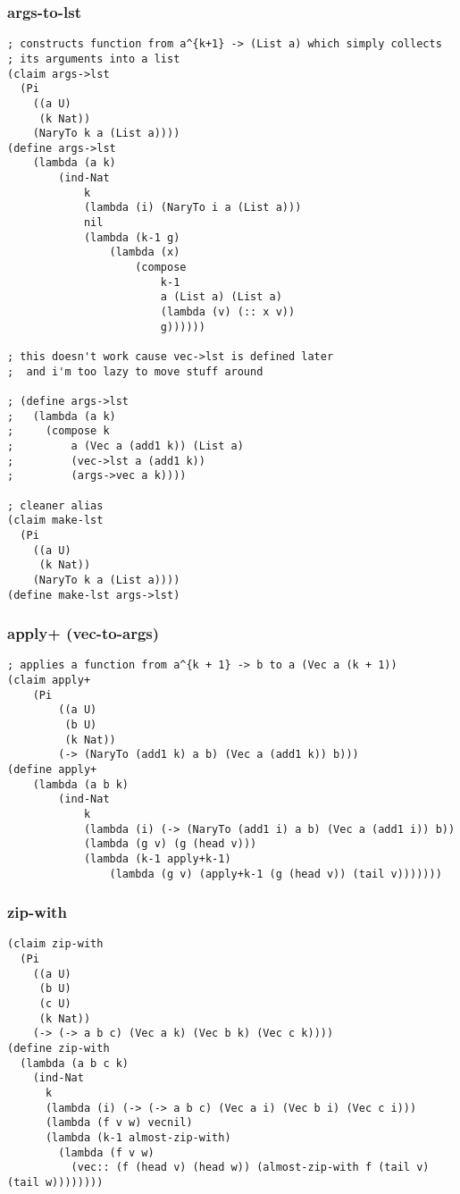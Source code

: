 \subsubsection{args-to-lst} \label{code:args-to-lst}
\begin{verbatim}
; constructs function from a^{k+1} -> (List a) which simply collects 
; its arguments into a list
(claim args->lst
  (Pi 
    ((a U) 
     (k Nat)) 
    (NaryTo k a (List a))))
(define args->lst
    (lambda (a k)
        (ind-Nat
            k
            (lambda (i) (NaryTo i a (List a)))
            nil
            (lambda (k-1 g)
                (lambda (x)
                    (compose
                        k-1
                        a (List a) (List a)
                        (lambda (v) (:: x v))
                        g))))))

; this doesn't work cause vec->lst is defined later
;  and i'm too lazy to move stuff around

; (define args->lst
;   (lambda (a k) 
;     (compose k 
;         a (Vec a (add1 k)) (List a) 
;         (vec->lst a (add1 k)) 
;         (args->vec a k))))

; cleaner alias
(claim make-lst
  (Pi 
    ((a U) 
     (k Nat)) 
    (NaryTo k a (List a))))
(define make-lst args->lst)
\end{verbatim}

\subsubsection{apply+ (vec-to-args)} \label{code:apply+}
\begin{verbatim}
; applies a function from a^{k + 1} -> b to a (Vec a (k + 1))
(claim apply+
    (Pi
        ((a U)
         (b U)
         (k Nat))
        (-> (NaryTo (add1 k) a b) (Vec a (add1 k)) b)))
(define apply+
    (lambda (a b k)
        (ind-Nat
            k
            (lambda (i) (-> (NaryTo (add1 i) a b) (Vec a (add1 i)) b))
            (lambda (g v) (g (head v)))
            (lambda (k-1 apply+k-1)
                (lambda (g v) (apply+k-1 (g (head v)) (tail v)))))))
\end{verbatim}

\subsubsection{zip-with} \label{code:zip-with}
\begin{verbatim}
(claim zip-with
  (Pi
    ((a U)
     (b U)
     (c U)
     (k Nat))
    (-> (-> a b c) (Vec a k) (Vec b k) (Vec c k))))
(define zip-with
  (lambda (a b c k)
    (ind-Nat
      k
      (lambda (i) (-> (-> a b c) (Vec a i) (Vec b i) (Vec c i)))
      (lambda (f v w) vecnil)
      (lambda (k-1 almost-zip-with)
        (lambda (f v w)
          (vec:: (f (head v) (head w)) (almost-zip-with f (tail v) (tail w))))))))
\end{verbatim}

